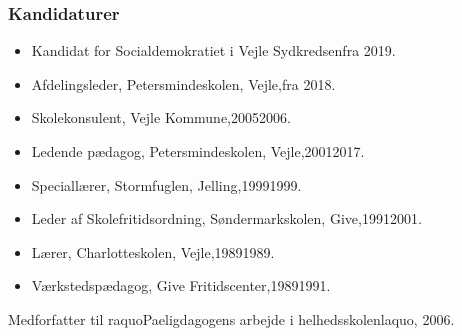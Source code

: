 \documentclass[11pt, a4paper]{awesome-cv}
\begin{document}
\begin{cvletter}
\subsubsection*{Kandidaturer}
\begin{itemize}
\item Kandidat for Socialdemokratiet i Vejle Sydkredsenfra 2019.
\end{itemize}
\begin{itemize}
\item Afdelingsleder, Petersmindeskolen, Vejle,fra 2018.
\item Skolekonsulent, Vejle Kommune,20052006.
\item Ledende pædagog, Petersmindeskolen, Vejle,20012017.
\item Speciallærer, Stormfuglen, Jelling,19991999.
\item Leder af Skolefritidsordning, Søndermarkskolen, Give,19912001.
\item Lærer, Charlotteskolen, Vejle,19891989.
\item Værkstedspædagog, Give Fritidscenter,19891991.
\end{itemize}
Medforfatter til raquoPaeligdagogens arbejde i helhedsskolenlaquo, 2006.

\end{cvletter}
\end{document}
